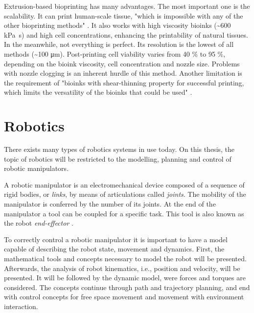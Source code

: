 Extrusion-based bioprinting has many advantages. The most important one is the scalability. It can print human-scale tissue, "which is impossible with any of the other bioprinting methods" \cite{Vijayavenkataraman2018_bioprinting_tissues_organs_regen_med}. It also works with high viscosity bioinks (\textasciitilde 600 \si{\kilo\pascal\second}) and high cell concentrations, enhancing the printability of natural tissues. In the meanwhile, not everything is perfect. Its resolution is the lowest of all methods (\textasciitilde 100 \si{\micro\meter}). Post-printing cell viability varies from 40 \% to 95 \%, depending on the bioink viscosity, cell concentration and nozzle size. Problems with nozzle clogging is an inherent hurdle of this method. Another limitation is the requirement of "bioinks with shear-thinning property for successful printing, which limits the versatility of the bioinks that could be used" \cite{Vijayavenkataraman2018_bioprinting_tissues_organs_regen_med}.





\section{Robotics}
\label{sec:robotics}

There exists many types of robotics systems in use today. On this thesis, the topic of robotics will be restricted to the modelling, planning and control of robotic manipulators.

A robotic manipulator is an electromechanical device composed of a sequence of rigid bodies, or \emph{links}, by means of articulations called \emph{joints}. The mobility of the manipulator is conferred by the number of its joints. At the end of the manipulator a tool can be coupled for a specific task. This tool is also known as the robot \emph{end-effector} \cite{Siciliano2009_robotics_modelling_planning_control}.

To correctly control a robotic manipulator it is important to have a model capable of describing the robot state, movement and dynamics. First, the mathematical tools and concepts necessary to model the robot will be presented. Afterwards, the analysis of robot kinematics, i.e., position and velocity, will be presented. It will be followed by the dynamic model, were forces and torques are considered. The concepts continue through path and trajectory planning, and end with control concepts for free space movement and movement with environment interaction.

